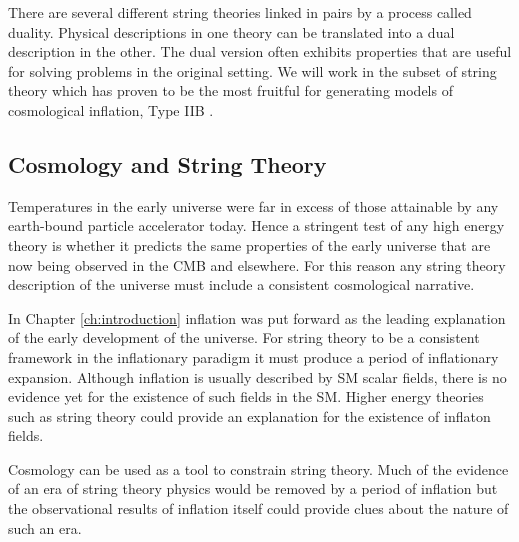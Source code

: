There are several different string theories linked in pairs by a process
called
duality. Physical descriptions in one theory can be translated into a
dual description in the other. The dual version often exhibits properties that
are useful for solving problems in the original setting.
We will work in the subset of string theory which has proven
to be the most
fruitful for generating models of cosmological inflation, Type IIB \cite{cline,
Linde:2005dd}. 
% 

\subsection{Cosmology and String Theory}
\label{sec:stringcos-dbiintro}
% 
Temperatures in the early universe were far in excess of those attainable by
any earth-bound particle accelerator today. Hence a stringent test of any high
energy
theory is whether it predicts the same properties of the early universe that are
now being observed in the CMB and elsewhere.
For this reason any string theory description of the universe must include a
consistent cosmological narrative. 

In Chapter \ref{ch:introduction} inflation was put forward as the leading
explanation of the early development of the universe. For string theory to be
a consistent framework in the inflationary paradigm it must produce a period of
inflationary expansion. Although inflation is usually described by SM scalar
fields, there is no
evidence yet for the existence of such fields in the SM. Higher
energy theories such as string theory could provide an explanation for the
existence of inflaton fields.


Cosmology can be used as a tool to constrain string theory. Much of the evidence
of an
era of string theory physics would be removed by a period of inflation but the
observational results of inflation itself could provide clues about the nature
of such an era. 

